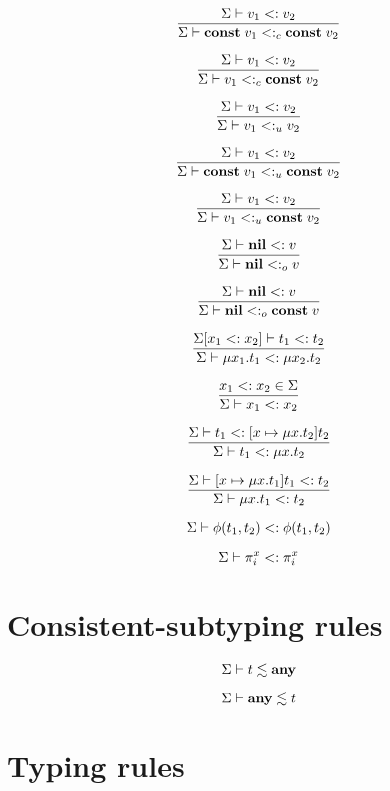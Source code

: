 \[
\dfrac{\Sigma \vdash v_{1} <: v_{2}}
      {\Sigma \vdash \mathbf{const} \; v_{1} <:_{c} \mathbf{const} \; v_{2}}
\]

\[
\dfrac{\Sigma \vdash v_{1} <: v_{2}}
      {\Sigma \vdash v_{1} <:_{c} \mathbf{const} \; v_{2}}
\]

\[
\dfrac{\Sigma \vdash v_{1} <: v_{2}}
      {\Sigma \vdash v_{1} <:_{u} v_{2}}
\]

\[
\dfrac{\Sigma \vdash v_{1} <: v_{2}}
      {\Sigma \vdash \mathbf{const} \; v_{1} <:_{u} \mathbf{const} \; v_{2}}
\]

\[
\dfrac{\Sigma \vdash v_{1} <: v_{2}}
      {\Sigma \vdash v_{1} <:_{u} \mathbf{const} \; v_{2}}
\]

\[
\dfrac{\Sigma \vdash \mathbf{nil} <: v}
      {\Sigma \vdash \mathbf{nil} <:_{o} v}
\]

\[
\dfrac{\Sigma \vdash \mathbf{nil} <: v}
      {\Sigma \vdash \mathbf{nil} <:_{o} \mathbf{const} \; v}
\]

\[
\dfrac{\Sigma[x_{1} <: x_{2}] \vdash t_{1} <: t_{2}}
      {\Sigma \vdash \mu x_{1}.t_{1} <: \mu x_{2}.t_{2}}
\]

\[
\dfrac{x_{1} <: x_{2} \in \Sigma}
      {\Sigma \vdash x_{1} <: x_{2}}
\]

\[
\dfrac{\Sigma \vdash t_{1} <: [x \mapsto \mu x.t_{2}]t_{2}}
      {\Sigma \vdash t_{1} <: \mu x.t_{2}}
\]

\[
\dfrac{\Sigma \vdash [x \mapsto \mu x.t_{1}]t_{1} <: t_{2}}
      {\Sigma \vdash \mu x.t_{1} <: t_{2}}
\]

\[
\Sigma \vdash \phi(t_{1},t_{2}) <: \phi(t_{1},t_{2})
\]

\[
\Sigma \vdash \pi_{i}^{x} <: \pi_{i}^{x}
\]

\section{Consistent-subtyping rules}

\noindent

\[
\Sigma \vdash t \lesssim \mathbf{any}
\]

\[
\Sigma \vdash \mathbf{any} \lesssim t
\]

\section{Typing rules}

